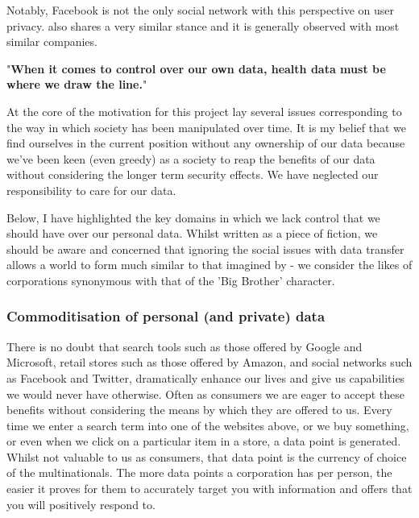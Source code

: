 Notably, Facebook is not the only social network with this perspective on user privacy. \cite{twittertos:2017:online} also shares a very similar stance and it is generally observed with most similar companies.

\begin{displayquote}{
  "\textbf{When it comes to control over our own data, health data must be where we draw the line.}"~\cite{wilbankstopol:2016:article}
}\end{displayquote}




At the core of the motivation for this project lay several issues corresponding to the way in which society has been manipulated over time. It is my belief that we find ourselves in the current position without any ownership of our data because we've been keen (even greedy) as a society to reap the benefits of our data without considering the longer term security effects. We have neglected our responsibility to care for our data.

Below, I have highlighted the key domains in which we lack control that we should have over our personal data. Whilst written as a piece of fiction, we should be aware and concerned that ignoring the social issues with data transfer allows a world to form much similar to that imagined by \cite{orwell:1984:book} - we consider the likes of corporations synonymous with that of the 'Big Brother' character.

\subsubsection{Commoditisation of personal (and private) data}

There is no doubt that search tools such as those offered by Google and Microsoft, retail stores such as those offered by Amazon, and social networks such as Facebook and Twitter, dramatically enhance our lives and give us capabilities we would never have otherwise. Often as consumers we are eager to accept these benefits without considering the means by which they are offered to us. Every time we enter a search term into one of the websites above, or we buy something, or even when we click on a particular item in a store, a data point is generated. Whilst not valuable to us as consumers, that data point is the currency of choice of the multinationals. The more data points a corporation has per person, the easier it proves for them to accurately target you with information and offers that you will positively respond to.

